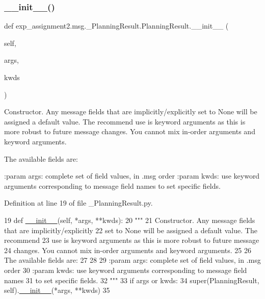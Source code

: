 \subsubsection{\texorpdfstring{\+\_\+\+\_\+init\+\_\+\+\_\+()}{\_\_init\_\_()}}
{\footnotesize\ttfamily def exp\+\_\+assignment2.\+msg.\+\_\+\+Planning\+Result.\+Planning\+Result.\+\_\+\+\_\+init\+\_\+\+\_\+ (\begin{DoxyParamCaption}\item[{}]{self,  }\item[{}]{args,  }\item[{}]{kwds }\end{DoxyParamCaption})}

\begin{DoxyVerb}Constructor. Any message fields that are implicitly/explicitly
set to None will be assigned a default value. The recommend
use is keyword arguments as this is more robust to future message
changes.  You cannot mix in-order arguments and keyword arguments.

The available fields are:
   

:param args: complete set of field values, in .msg order
:param kwds: use keyword arguments corresponding to message field names
to set specific fields.
\end{DoxyVerb}
 

Definition at line 19 of file \+\_\+\+Planning\+Result.\+py.


\begin{DoxyCode}
19   \textcolor{keyword}{def }\hyperlink{classstate__machine_1_1Play_a5993a23d8be7f7b2647f71ede0334957}{\_\_init\_\_}(self, *args, **kwds):
20     \textcolor{stringliteral}{"""}
21 \textcolor{stringliteral}{    Constructor. Any message fields that are implicitly/explicitly}
22 \textcolor{stringliteral}{    set to None will be assigned a default value. The recommend}
23 \textcolor{stringliteral}{    use is keyword arguments as this is more robust to future message}
24 \textcolor{stringliteral}{    changes.  You cannot mix in-order arguments and keyword arguments.}
25 \textcolor{stringliteral}{}
26 \textcolor{stringliteral}{    The available fields are:}
27 \textcolor{stringliteral}{       }
28 \textcolor{stringliteral}{}
29 \textcolor{stringliteral}{    :param args: complete set of field values, in .msg order}
30 \textcolor{stringliteral}{    :param kwds: use keyword arguments corresponding to message field names}
31 \textcolor{stringliteral}{    to set specific fields.}
32 \textcolor{stringliteral}{    """}
33     \textcolor{keywordflow}{if} args \textcolor{keywordflow}{or} kwds:
34       super(PlanningResult, self).\hyperlink{classstate__machine_1_1Play_a5993a23d8be7f7b2647f71ede0334957}{\_\_init\_\_}(*args, **kwds)
35 
\end{DoxyCode}


